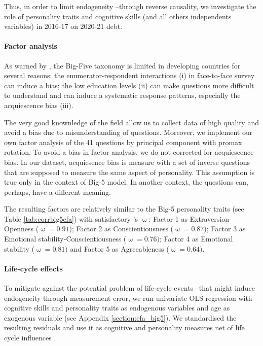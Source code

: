 \documentclass[a4paper, 11pt, onecolumn]{article}
\begin{document}
Thus, in order to limit endogeneity --through reverse causality, we investigate the role of personality traits and cognitive skills (and all others independents variables) in 2016-17 on 2020-21 debt.



\paragraph{Factor analysis}
As warned by \cite{Laajaj2019}, the Big-Five taxonomy is limited in developing countries for several reasons: the enumerator-respondent interactions (i) in face-to-face survey can induce a bias; the low education levels (ii) can make questions more difficult to understand and can induce a systematic response patterns, especially the acquiescence bias (iii).

The very good knownledge of the field allow us to collect data of high quality and avoid a bias due to misunderstanding of questions.
Moreover, we implement our own factor analysis of the 41 questions by principal component with promax rotation.
To avoid a bias in factor analysis, we do not corrected for acquiescence bias.
In our dataset, acquiesence bias is measure with a set of inverse questions that are supposed to measure the same aspect of personality. 
This assumption is true only in the context of Big-5 model. 
In another context, the questions can, perhaps, have a different meaning.

The resulting factors are relatively similar to the Big-5 personality traits (see Table \ref{tab:corrbig5efa}) with satisfactory \citeauthor{McDonald1999}'s $\upomega$: Factor 1 as Extraversion-Openness ($\upomega=0.91)$; Factor 2 as Conscientiousness ($\upomega=0.87)$; Factor 3 as Emotional stability-Conscientiousness ($\upomega=0.76)$; Factor 4 as Emotional stability ($\upomega=0.81)$ and Factor 5 as Agreeableness ($\upomega=0.64)$.

\paragraph{Life-cycle effects}
To mitigate against the potential problem of life-cycle events --that might induce endogeneity through measurement error, we run univariate OLS regression with cognitive skills and personality traits as endogenous variables and age as exogenous variable (see Appendix \ref{section:efa_big5}).
We standardised the resulting residuals and use it as cognitive and personality measures net of life cycle influences \citep{Nyhus2005, Brown2014}. 
\end{document}
